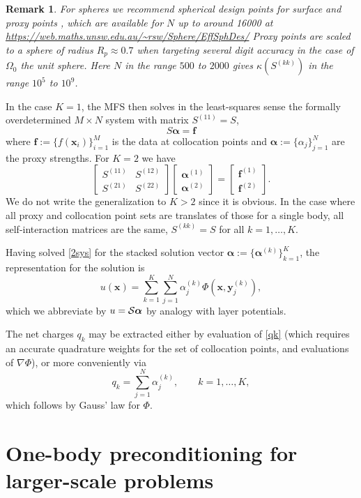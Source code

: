 \documentclass[10pt]{article}
\newcommand{\be}{\begin{equation}}
\newcommand{\ee}{\end{equation}}
\newcommand{\vt}[2]{\left[\begin{array}{r}#1\\#2\end{array}\right]} %
\newcommand{\mt}[4]{\left[\begin{array}{rr}#1&#2\\#3&#4\end{array}\right]} %
\newtheorem{rmk}[thm]{Remark}
\newcommand{\x}{\mathbf{x}}
\newcommand{\y}{\mathbf{y}}
\newcommand{\f}{\mathbf{f}}
\newcommand{\bal}{\bm{\alpha}}
\newcommand{\ok}{^{(k)}}
\begin{document}
\begin{rmk}
  For spheres we recommend spherical design points for surface and proxy
  points \cite{sphdesign},
which are available for $N$ up to around 16000 at
\url{https://web.maths.unsw.edu.au/~rsw/Sphere/EffSphDes/}
Proxy points are scaled to a sphere of radius $R_p \approx 0.7$
when targeting several digit accuracy in the case of $\Omega_0$ the unit sphere.
Here $N$ in the range $500$ to $2000$ gives
$\kappa(S^{(kk)})$ in the range $10^5$ to $10^9$.
\end{rmk}

In the case $K=1$, the MFS then solves in the least-squares sense the
formally overdetermined $M\times N$ system with matrix $S^{(11)} = S$,
\be
S \bal = \f
\label{1sys}
\ee
where $\f:=\{f(\x_i)\}_{i=1}^M$ is the data at collocation points
and $\bal:=\{\alpha_j\}_{j=1}^N$ are the proxy strengths.
For $K=2$ we have
\be
\mt{S^{(11)}}{S^{(12)}}{S^{(21)}}{S^{(22)}} \vt{\bal^{(1)}}{\bal^{(2)}} = \vt{\f^{(1)}}{\f^{(2)}}.
\label{2sys}
\ee
We do not write the generalization to $K>2$ since it is obvious.
In the case where all proxy and collocation point sets are
translates of those for a single body,
all self-interaction matrices are the same,
$S^{(kk)} = S$ for all $k=1,\dots,K$.

Having solved \eqref{2sys} for the stacked solution vector
$\bal:=\{\bal\ok\}_{k=1}^K$, the representation for the
solution is
\be
u(\x) = \sum_{k=1}^K \sum_{j=1}^N \alpha\ok_j \Phi(\x,\y\ok_j),
\label{rep}
\ee
which we abbreviate by $u = {\cal S}\bal$ by analogy with layer potentials.

The net charges $q_k$ may be extracted either by evaluation of
\eqref{qk} (which requires an accurate quadrature weights
for the set of collocation points, and evaluations of $\nabla \Phi$),
or more conveniently via
\be
q_k = \sum_{j=1}^N \alpha\ok_j, \qquad k=1,\dots,K,
\label{qkgauss}
\ee
which follows by Gauss' law for $\Phi$.


\section{One-body preconditioning for larger-scale problems}
\end{document}
